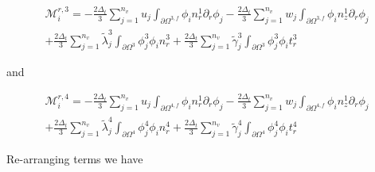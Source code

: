 \documentclass{article}
\begin{document}
\begin{equation}
\begin{array}{l} \mathcal{M}_i^{r,3} = -\frac{2\Delta_t}{3} \sum_{j=1}^{n_v} u_j \int_{\partial \Omega^{3,f}} \phi_i n_r^1 \partial_r \phi_j - \frac{2\Delta_t}{3} \sum_{j=1}^{n_v} w_j \int_{\partial \Omega^{3,f}} \phi_i n_z^1 \partial_r \phi_j \\ + \frac{2\Delta_t}{3} \sum_{j=1}^{n_v} \tilde{\lambda}_j^3 \int_{\partial \Omega^{3}} \phi_j^3 \phi_i n_r^3 + \frac{2\Delta_t}{3} \sum_{j=1}^{n_v} \tilde{\gamma}_j^3 \int_{\partial \Omega^{3}} \phi_j^3 \phi_i t_r^3 \end{array} \tag{4.90}
\end{equation}

and

\begin{equation}
\begin{array}{l} \mathcal{M}_i^{r,4} = -\frac{2\Delta_t}{3} \sum_{j=1}^{n_v} u_j \int_{\partial \Omega^{4,f}} \phi_i n_r^1 \partial_r \phi_j - \frac{2\Delta_t}{3} \sum_{j=1}^{n_v} w_j \int_{\partial \Omega^{4,f}} \phi_i n_z^1 \partial_r \phi_j \\ + \frac{2\Delta_t}{3} \sum_{j=1}^{n_v} \tilde{\lambda}_j^4 \int_{\partial \Omega^{4}} \phi_j^4 \phi_i n_r^4 + \frac{2\Delta_t}{3} \sum_{j=1}^{n_v} \tilde{\gamma}_j^4 \int_{\partial \Omega^{4}} \phi_j^4 \phi_i t_r^4 \end{array} \tag{4.91}
\end{equation}

Re-arranging terms we have
\end{document}
